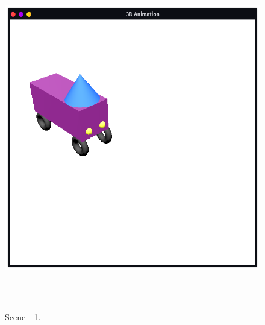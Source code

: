 \documentclass[12pt, a4]{article}
\begin{document}
\newpage
\subsection*{}
\begin{figure}[h]
\centering
\caption{Scene - 1.}
\includegraphics[height=15cm, width=15cm]{Outputs/Animation-0.png}
\end{figure}

\newpage
\end{document}
